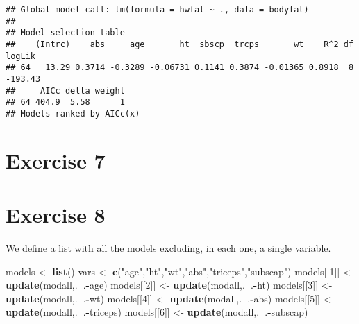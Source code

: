 \documentclass[]{article}
\newenvironment{Shaded}{\begin{snugshade}}{\end{snugshade}}
\newcommand{\DecValTok}[1]{\textcolor[rgb]{0.00,0.00,0.81}{#1}}
\newcommand{\KeywordTok}[1]{\textcolor[rgb]{0.13,0.29,0.53}{\textbf{#1}}}
\newcommand{\NormalTok}[1]{#1}
\newcommand{\OperatorTok}[1]{\textcolor[rgb]{0.81,0.36,0.00}{\textbf{#1}}}
\newcommand{\StringTok}[1]{\textcolor[rgb]{0.31,0.60,0.02}{#1}}
\begin{document}
\begin{verbatim}
## Global model call: lm(formula = hwfat ~ ., data = bodyfat)
## ---
## Model selection table 
##    (Intrc)    abs     age       ht  sbscp  trcps       wt    R^2 df  logLik
## 64   13.29 0.3714 -0.3289 -0.06731 0.1141 0.3874 -0.01365 0.8918  8 -193.43
##     AICc delta weight
## 64 404.9  5.58      1
## Models ranked by AICc(x)
\end{verbatim}

\hypertarget{exercise-7}{%
\section{Exercise 7}\label{exercise-7}}

\newpage

\hypertarget{exercise-8}{%
\section{Exercise 8}\label{exercise-8}}

We define a list with all the models excluding, in each one, a single
variable.

\begin{Shaded}
\begin{Highlighting}[]
\NormalTok{models <-}\StringTok{ }\KeywordTok{list}\NormalTok{()}
\NormalTok{vars <-}\StringTok{ }\KeywordTok{c}\NormalTok{(}\StringTok{"age"}\NormalTok{,}\StringTok{"ht"}\NormalTok{,}\StringTok{"wt"}\NormalTok{,}\StringTok{"abs"}\NormalTok{,}\StringTok{"triceps"}\NormalTok{,}\StringTok{"subscap"}\NormalTok{)}
\NormalTok{models[[}\DecValTok{1}\NormalTok{]] <-}\StringTok{ }\KeywordTok{update}\NormalTok{(modall,.}\OperatorTok{~}\NormalTok{.}\OperatorTok{-}\NormalTok{age)}
\NormalTok{models[[}\DecValTok{2}\NormalTok{]] <-}\StringTok{ }\KeywordTok{update}\NormalTok{(modall,.}\OperatorTok{~}\NormalTok{.}\OperatorTok{-}\NormalTok{ht)}
\NormalTok{models[[}\DecValTok{3}\NormalTok{]] <-}\StringTok{ }\KeywordTok{update}\NormalTok{(modall,.}\OperatorTok{~}\NormalTok{.}\OperatorTok{-}\NormalTok{wt)}
\NormalTok{models[[}\DecValTok{4}\NormalTok{]] <-}\StringTok{ }\KeywordTok{update}\NormalTok{(modall,.}\OperatorTok{~}\NormalTok{.}\OperatorTok{-}\NormalTok{abs)}
\NormalTok{models[[}\DecValTok{5}\NormalTok{]] <-}\StringTok{ }\KeywordTok{update}\NormalTok{(modall,.}\OperatorTok{~}\NormalTok{.}\OperatorTok{-}\NormalTok{triceps)}
\NormalTok{models[[}\DecValTok{6}\NormalTok{]] <-}\StringTok{ }\KeywordTok{update}\NormalTok{(modall,.}\OperatorTok{~}\NormalTok{.}\OperatorTok{-}\NormalTok{subscap)}
\end{Highlighting}
\end{Shaded}
\end{document}
